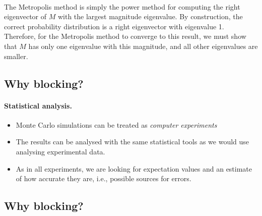 \documentclass[%
twoside,                 %
final,                   %
10pt]{article}
\begin{document}
\paragraph{}
The Metropolis method is simply the power method for computing the
right eigenvector of $M$ with the largest magnitude eigenvalue.
By construction, the correct probability distribution is a right eigenvector
with eigenvalue 1. Therefore, for the Metropolis method to converge
to this result, we must show that $M$ has only one eigenvalue with this
magnitude, and all other eigenvalues are smaller.




\subsection{Why blocking?}

\paragraph{Statistical analysis.}
\begin{itemize}
    \item Monte Carlo simulations can be treated as \emph{computer experiments}

    \item The results can be analysed with the same statistical tools as we would use analysing experimental data.

    \item As in all experiments, we are looking for expectation values and an estimate of how accurate they are, i.e., possible sources for errors.
\end{itemize}

\noindent

    

\subsection{Why blocking?}

\end{document}
